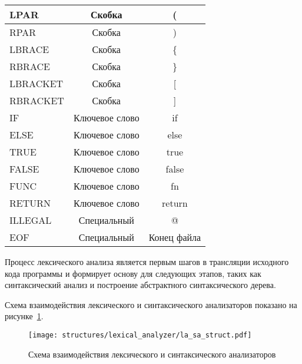 \begin{table}[h!]
\begin{tabularx}{\textwidth}{|X|c|c|}
        \hline
        LPAR          & Скобка         & (               \\
        \hline
        RPAR          & Скобка         & )               \\
        \hline
        LBRACE        & Скобка         & \{              \\
        \hline
        RBRACE        & Скобка         & \}              \\
        \hline
        LBRACKET      & Скобка         & [               \\
        \hline
        RBRACKET      & Скобка         & ]               \\
        \hline
        IF            & Ключевое слово & if              \\
        \hline
        ELSE          & Ключевое слово & else            \\
        \hline
        TRUE          & Ключевое слово & true            \\
        \hline
        FALSE         & Ключевое слово & false           \\
        \hline
        FUNC          & Ключевое слово & fn              \\
        \hline
        RETURN        & Ключевое слово & return          \\
        \hline
        ILLEGAL       & Специальный    & @               \\
        \hline
        EOF           & Специальный    & Конец файла     \\
        \hline
    \end{tabularx}
    \vspace{\bottompaddingoftable}
\end{table}

Процесс лексического анализа является первым шагов в трансляции исходного кода программы и формирует основу для следующих этапов,
таких как синтаксический анализ и построение абстрактного синтаксического дерева.

Схема взаимодействия лексического и синтаксического анализаторов показано на рисунке~\ref{f:la_sa_struct}.

\begin{figure}[ht]
	\centering
	\vspace{\toppaddingoffigure}
	\texttt{[image: structures/lexical\_analyzer/la\_sa\_struct.pdf]}
	\caption{Схема взаимодействия лексического и синтаксического анализаторов}
	\label{f:la_sa_struct}
\end{figure}

